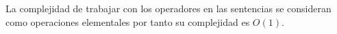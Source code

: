 La complejidad de trabajar con los operadores en las sentencias se consideran como operaciones elementales por tanto su complejidad es $O(1)$.